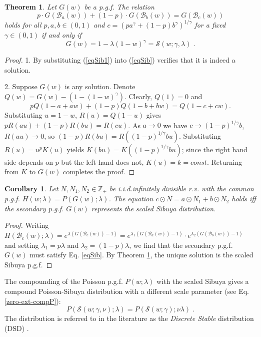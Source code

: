 \documentclass[a4paper,12pt]{amsart}
\newcommand{\Z}{\mathbb{Z}_{+}}
\newcommand{\iid}{i.i.d.}
\newtheorem{Theorem}{Theorem}[section]
\newtheorem{Corollary}{Corollary}[section]
\theoremstyle{definition}
\theoremstyle{remark}
\begin{document}
\begin{Theorem}\label{ThSib} Let $G(w)$ be a p.g.f. The relation
\begin{equation}\label{eqSib}
p\cdot G(\mathcal{B}_a(w))+(1-p)\cdot G(\mathcal{B}_b(w)) = G(\mathcal{B}_c(w))
\end{equation}
holds for all $p,a,b \in (0,1)$ and $c=(pa^{\gamma}+(1-p)b^{\gamma})^{1/\gamma}$ for a fixed $\gamma \in (0,1)$ if and only if 
\begin{equation}\label{eqSib1}
G(w)= 1-\lambda (1-w)^{\gamma}=\mathcal{S}(w;\gamma,\lambda)\;.   
\end{equation}
\end{Theorem}
\begin{proof}
1. By substituting (\ref{eqSib1}) into (\ref{eqSib}) verifies that it is indeed a solution. 

2. Suppose $G(w)$ is any solution. Denote $Q(w)=G(w)-(1-(1-w)^{\gamma})$. Clearly, $Q(1)=0$ and 
\[ p Q(1-a+aw)+(1-p)Q(1-b+bw)=Q(1-c+cw). \]
Substituting $u=1-w$, $R(u)=Q(1-u)$ gives
$p R(au)+(1-p)R(bu) = R(cu)$.
As $a \to 0$ we have $c \to (1-p)^{1/\gamma}b$, $R(au) \to 0$, so $ (1-p) R(bu) = R((1-p)^{1/\gamma}bu)$.
Substituting $R(u)=u^{p}K(u)$ yields
$ K(bu)=K((1-p)^{1/\gamma}bu)$; since the right hand side depends on $p$ but the left-hand does not, $K(u)=k=const$. Returning from $K$ to $G(w)$  completes the proof.
\end{proof}

\begin{Corollary}\label{DSD_unique}
    Let $N, N_1, N_2 \in \Z$ be \iid infinitely divisible r.v.  with the common p.g.f. $H(w;\lambda)=P(G(w);\lambda)$. The equation $c\odot N = a \odot N_1 + b\odot N_2$ holds iff the secondary p.g.f. $G(w)$ represents the scaled Sibuya distribution.
\end{Corollary}
\begin{proof}
Writing 
$H(\mathcal{B}_c(w);\lambda)=e^{\lambda(G(\mathcal{B}_c(w))-1)}=e^{\lambda_1(G(\mathcal{B}_a(w))-1)}\cdot e^{\lambda_2(G(\mathcal{B}_b(w))-1)}$ and setting $\lambda_1=p\lambda$ and $\lambda_2=(1-p)\lambda$, we find that the secondary p.g.f. $G(w)$ must satisfy Eq. \ref{eqSib}. By Theorem \ref{ThSib}, the unique solution is the scaled Sibuya p.g.f.
\end{proof}
The compounding of the Poisson p.g.f. $P(w;\lambda)$ with the scaled Sibuya gives a compound Poisson-Sibuya distribution with a different scale parameter (see  Eq.\ref{zero-ext-compP}):
\[
P(\mathcal{S}(w;\gamma,\nu);\lambda) = P(\mathcal{S}(w;\gamma);\nu \lambda)\;.
\]
 The distribution is referred to in the literature as the {\it Discrete Stable} distribution (DSD) \cite{Christoph2000, StvH2004}.
\end{document}
